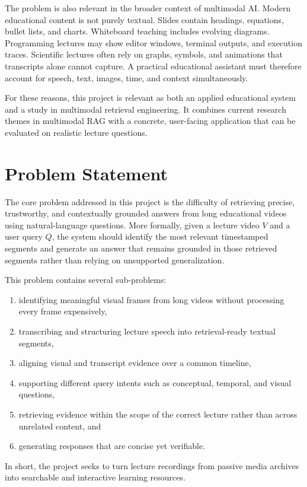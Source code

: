 \documentclass[12pt,a4paper,oneside]{report}
\begin{document}
The problem is also relevant in the broader context of multimodal AI. Modern educational content is not purely textual. Slides contain headings, equations, bullet lists, and charts. Whiteboard teaching includes evolving diagrams. Programming lectures may show editor windows, terminal outputs, and execution traces. Scientific lectures often rely on graphs, symbols, and animations that transcripts alone cannot capture. A practical educational assistant must therefore account for speech, text, images, time, and context simultaneously.

For these reasons, this project is relevant as both an applied educational system and a study in multimodal retrieval engineering. It combines current research themes in multimodal RAG with a concrete, user-facing application that can be evaluated on realistic lecture questions.

\section{Problem Statement}
The core problem addressed in this project is the difficulty of retrieving precise, trustworthy, and contextually grounded answers from long educational videos using natural-language questions. More formally, given a lecture video $V$ and a user query $Q$, the system should identify the most relevant timestamped segments and generate an answer that remains grounded in those retrieved segments rather than relying on unsupported generalization.

This problem contains several sub-problems:
\begin{enumerate}[label=\arabic*.]
    \item identifying meaningful visual frames from long videos without processing every frame expensively,
    \item transcribing and structuring lecture speech into retrieval-ready textual segments,
    \item aligning visual and transcript evidence over a common timeline,
    \item supporting different query intents such as conceptual, temporal, and visual questions,
    \item retrieving evidence within the scope of the correct lecture rather than across unrelated content, and
    \item generating responses that are concise yet verifiable.
\end{enumerate}

In short, the project seeks to turn lecture recordings from passive media archives into searchable and interactive learning resources.
\end{document}
